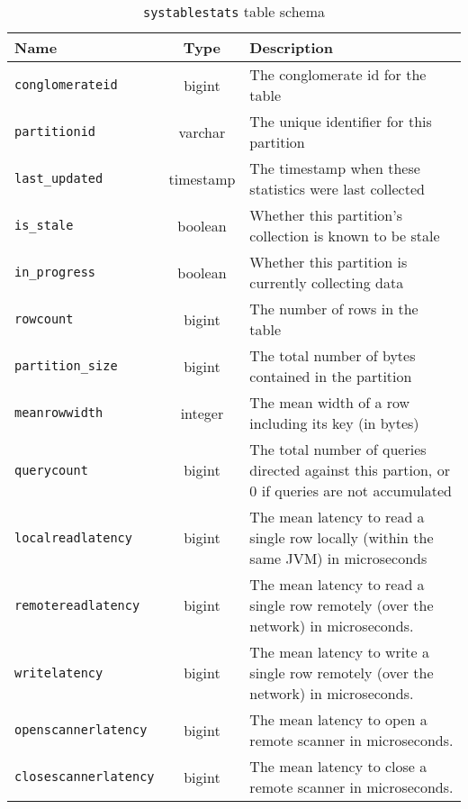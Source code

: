 \begin{table}
				\begin{tabular}{|l|c|p{6cm}|}
								\hline
								\bf{Name}														& \bf{Type}	&	\bf{Description} \\ \hline	
								\texttt{conglomerateid}								&	bigint		&	The conglomerate id for the table \\ \hline
								\texttt{partitionid}								&	varchar		&	The unique identifier for this partition \\ \hline
								\texttt{last\_updated}							&	timestamp	&	The timestamp when these statistics were last collected \\ \hline
								\texttt{is\_stale}									&	boolean		&	Whether this partition's collection is known to be stale	\\ \hline
								\texttt{in\_progress}								&	boolean		&	Whether this partition is currently collecting data \\ \hline
								\texttt{rowcount}										&	bigint		&	The number of rows in the table \\ \hline
								\texttt{partition\_size}						&	bigint		&	The total number of bytes contained in the partition \\ \hline
								\texttt{meanrowwidth}								&	integer		&	The mean width of a row including its key (in bytes) \\ \hline
								\texttt{querycount}									&	bigint		&	The total number of queries directed against this partion, or 0 if queries are not accumulated \\ \hline
								\texttt{localreadlatency}						&	bigint		&	The mean latency to read a single row locally (within the same JVM) in microseconds\\ \hline
								\texttt{remotereadlatency}					&	bigint		&	The mean latency to read a single row remotely (over the network) in microseconds. \\ \hline
								\texttt{writelatency}								&	bigint		&	The mean latency to write a single row remotely (over the network) in microseconds. \\ \hline
								\texttt{openscannerlatency}					&	bigint		&	The mean latency to open a remote scanner in microseconds. \\ \hline
								\texttt{closescannerlatency}				&	bigint		&	The mean latency to close a remote scanner in microseconds. \\ \hline
				\end{tabular}
				\caption{\texttt{systablestats} table schema}
				\label{table:tableStats}
\end{table}
